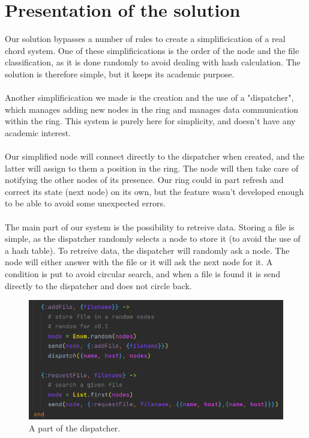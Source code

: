 \documentclass{article}
\begin{document}
\pagebreak

\section{Presentation of the solution}

Our solution bypasses a number of rules to create a simplificication of a real chord system. One of these simplificications is the order of the node and the file classification, as it is done randomly to avoid dealing with hash calculation. The solution is therefore simple, but it keeps its academic purpose.
\\\\
Another simplificication we made is the creation and the use of a "dispatcher", which manages adding new nodes in the ring and manages data communication within the ring. This system is purely here for simplicity, and doesn't have any academic interest.
\\\\
Our simplified node will connect directly to the dispatcher when created, and the latter will assign to them a position in the ring. The node will then take care of notifying the other nodes of its presence. Our ring could in part refresh and correct its state (next node) on its own, but the feature wasn't developed enough to be able to avoid some unexpected errors.
\\\\
The main part of our system is the possibility to retreive data. Storing a file is simple, as the dispatcher randomly selects a node to store it (to avoid the use of a hash table). To retreive data, the dispatcher will randomly ask a node. The node will either answer with the file or it will ask the next node for it. A condition is put to avoid circular search, and when a file is found it is send directly to the dispatcher and does not circle back.

\begin{figure}[!htbp]
  \centering
  \includegraphics[width=\textwidth]{img/dispatch.png}
  \caption{A part of the dispatcher.}
  \label{figure 2 :}
\end{figure}
\end{document}
